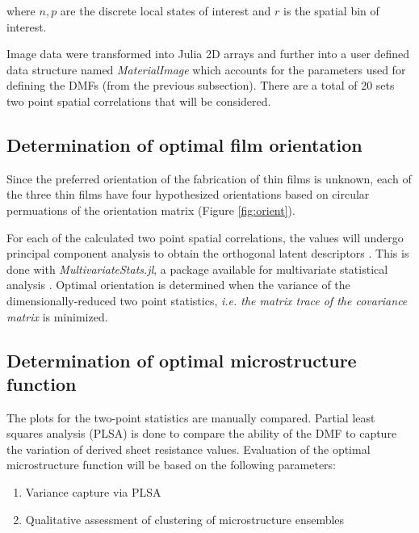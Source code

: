 where $n, p$ are the discrete local states of interest and $r$ is the spatial bin of interest.

Image data were transformed into Julia 2D arrays \cite{julia15} and further into a user defined data structure named \emph{MaterialImage} which accounts for the parameters used for defining the DMFs (from the previous subsection).
There are a total of 20 sets two point spatial correlations that will be considered.

\subsection{Determination of optimal film orientation}
Since the preferred orientation of the fabrication of thin films is unknown, each of the three thin films have four hypothesized orientations based on circular permuations of the orientation matrix (Figure \ref{fig:orient}).

For each of the calculated two point spatial correlations, the values will undergo principal component analysis to obtain the orthogonal latent descriptors \cite{gupta15, sun17}.
This is done with \emph{MultivariateStats.jl}, a package available for multivariate statistical analysis \cite{mvstats}.
Optimal orientation is determined when the variance of the dimensionally-reduced two point statistics, \textit{i.e. the matrix trace of the covariance matrix} is minimized.

\subsection{Determination of optimal microstructure function}
The plots for the two-point statistics are manually compared.
Partial least squares analysis (PLSA) is done to compare the ability of the DMF to capture the variation of derived sheet resistance values.
Evaluation of the optimal microstructure function will be based on the following parameters:

\begin{enumerate}
  \item Variance capture via PLSA
  \item Qualitative assessment of clustering of microstructure ensembles
\end{enumerate}
